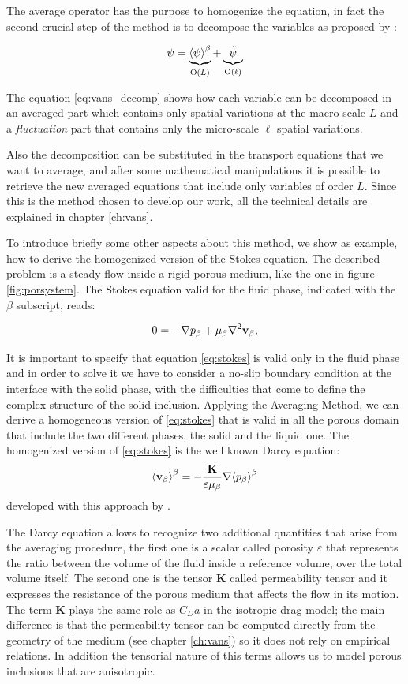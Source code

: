 The average operator has the purpose to homogenize the equation, in fact the second crucial step of the method is to decompose the variables as proposed by \citet{gray1975derivation}:

\begin{equation}
\psi =   \underbrace{ {\left< \psi \right>}^{\beta} }_\text{O($L$)}  +  \underbrace{\tilde{\psi} }_\text{O($\ell$)}
\label{eq:vans_decomp}
\end{equation}

The equation \eqref{eq:vans_decomp} shows how each variable can be decomposed in an averaged part which contains only spatial variations at the macro-scale $L$ and a \textit{fluctuation} part that contains only the micro-scale $\ell$ spatial variations.

Also the decomposition can be substituted in the transport equations that we want to average, and after some mathematical manipulations it is possible to retrieve the new averaged equations that include only variables of order $L$.
Since this is the method chosen to develop our work, all the technical details are explained in chapter \ref{ch:vans}.

To introduce briefly some other aspects about this method, we show as example, how to derive the homogenized version of the Stokes equation. The described problem is a steady flow inside a rigid porous medium, like the one in figure \ref{fig:porsystem}.
The Stokes equation valid for the fluid phase, indicated with the $\beta$ subscript, reads:

\begin{equation}
0 = - \nabla p_{\beta} +\mu_{\beta} \nabla^2 \textbf{v}_{\beta},
\label{eq:stokes}
\end{equation} 

It is important to specify that equation \eqref{eq:stokes} is valid only in the fluid phase and in order to solve it we have to consider a no-slip boundary condition at the interface with the solid phase, with the difficulties that come to define the complex structure of the solid inclusion.
Applying the Averaging Method, we can derive a homogeneous version of \eqref{eq:stokes} that is valid in all the porous domain that include the two different phases, the solid and the liquid one.
The homogenized version of \eqref{eq:stokes} is the well known Darcy equation:
$${\left< \textbf{v}_{\beta} \right>}^{\beta} = -\dfrac{ \mathbf{K} }{\varepsilon \mu_{\beta}} \nabla {\left< p_{\beta} \right>}^{\beta}$$
developed with this approach by  \citet{whitaker1986flow}.

The Darcy equation allows to recognize two additional quantities that arise from the averaging procedure, the first one is a scalar called porosity $\varepsilon$ that represents the ratio between the volume of the fluid inside a reference volume, over the total volume itself.
The second one is the tensor $\mathbf{K}$ called permeability tensor and it expresses the resistance of the porous medium that affects the flow in its motion.
The term $\mathbf{K}$ plays the same role as $C_D a$ in the isotropic drag model; the main difference is that the permeability tensor can be computed directly from the geometry of the medium (see chapter \ref{ch:vans}) so it does not rely on empirical relations.
In addition the tensorial nature of this terms allows us to model porous inclusions that are anisotropic.

